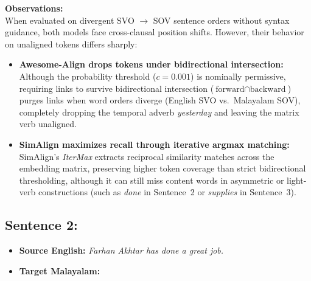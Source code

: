 \FloatBarrier

\noindent
\textbf{Observations:}\\
When evaluated on divergent SVO $\to$ SOV sentence orders without syntax guidance, both models face cross-clausal position shifts. However, their behavior on unaligned tokens differs sharply:
\begin{itemize}[noitemsep]
    \item \textbf{Awesome-Align drops tokens under bidirectional intersection:} Although the probability threshold ($c = 0.001$) is nominally permissive, requiring links to survive bidirectional intersection ($\text{forward} \cap \text{backward}$) purges links when word orders diverge (English SVO vs.\ Malayalam SOV), completely dropping the temporal adverb \textit{yesterday} and leaving the matrix verb  unaligned.
    \item \textbf{SimAlign maximizes recall through iterative argmax matching:} SimAlign's \textit{IterMax} extracts reciprocal similarity matches across the embedding matrix, preserving higher token coverage than strict bidirectional thresholding, although it can still miss content words in asymmetric or light-verb constructions (such as \textit{done} in Sentence~2 or \textit{supplies} in Sentence~3).
\end{itemize}

\subsection{Sentence 2:}
\begin{itemize}[noitemsep]
    \item \textbf{Source English:} \textit{Farhan Akhtar has done a great job.}
    \item \textbf{Target Malayalam:}\\
\end{itemize}



